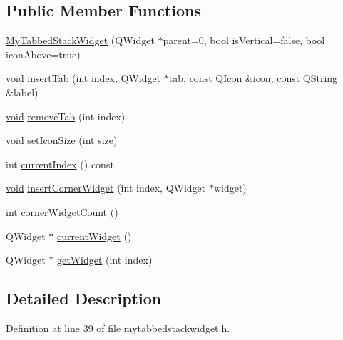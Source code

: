 \subsection*{\-Public \-Member \-Functions}
\begin{DoxyCompactItemize}
\item 
\hyperlink{class_my_tabbed_stack_widget_a45f38b17b9cbdb32460e12c2ccfd5bc5}{\-My\-Tabbed\-Stack\-Widget} (\-Q\-Widget $\ast$parent=0, bool is\-Vertical=false, bool icon\-Above=true)
\item 
\hyperlink{group___u_a_v_objects_plugin_ga444cf2ff3f0ecbe028adce838d373f5c}{void} \hyperlink{class_my_tabbed_stack_widget_a6658d23fb4e0f3ae7324b313f5a7b062}{insert\-Tab} (int index, \-Q\-Widget $\ast$tab, const \-Q\-Icon \&icon, const \hyperlink{group___u_a_v_objects_plugin_gab9d252f49c333c94a72f97ce3105a32d}{\-Q\-String} \&label)
\item 
\hyperlink{group___u_a_v_objects_plugin_ga444cf2ff3f0ecbe028adce838d373f5c}{void} \hyperlink{class_my_tabbed_stack_widget_a2c275028a87ba60b343b6da3fa21db5a}{remove\-Tab} (int index)
\item 
\hyperlink{group___u_a_v_objects_plugin_ga444cf2ff3f0ecbe028adce838d373f5c}{void} \hyperlink{class_my_tabbed_stack_widget_adb5bf6edcd958fc360a1c8ac429c7a9d}{set\-Icon\-Size} (int size)
\item 
int \hyperlink{class_my_tabbed_stack_widget_a791fd756fe24cbd0e0334335701915e1}{current\-Index} () const 
\item 
\hyperlink{group___u_a_v_objects_plugin_ga444cf2ff3f0ecbe028adce838d373f5c}{void} \hyperlink{class_my_tabbed_stack_widget_a5657f3b6910b0335c8d6fa78e98caa09}{insert\-Corner\-Widget} (int index, \-Q\-Widget $\ast$widget)
\item 
int \hyperlink{class_my_tabbed_stack_widget_a669cd92d77d9616b4526c7cf1abfa2a5}{corner\-Widget\-Count} ()
\item 
\-Q\-Widget $\ast$ \hyperlink{class_my_tabbed_stack_widget_a54de7410a5b308e2ea32fe95da7a1ed9}{current\-Widget} ()
\item 
\-Q\-Widget $\ast$ \hyperlink{class_my_tabbed_stack_widget_a26d2df6637c94d03f943b431557f647c}{get\-Widget} (int index)
\end{DoxyCompactItemize}


\subsection{\-Detailed \-Description}


\-Definition at line 39 of file mytabbedstackwidget.\-h.



